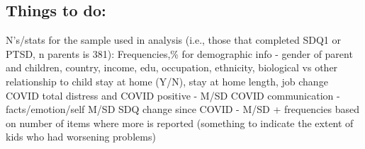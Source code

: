 \documentclass[
  english,
  man]{apa6}
\begin{document}
\hypertarget{things-to-do}{%
\subsection{Things to do:}\label{things-to-do}}

N's/stats for the sample used in analysis (i.e., those that completed SDQ1 or PTSD, n parents is 381):
Frequencies,\% for demographic info - gender of parent and children, country, income, edu, occupation, ethnicity, biological vs other relationship to child
stay at home (Y/N), stay at home length, job change
COVID total distress and COVID positive - M/SD
COVID communication - facts/emotion/self M/SD
SDQ change since COVID - M/SD + frequencies based on number of items where more is reported (something to indicate the extent of kids who had worsening problems)
\end{document}
